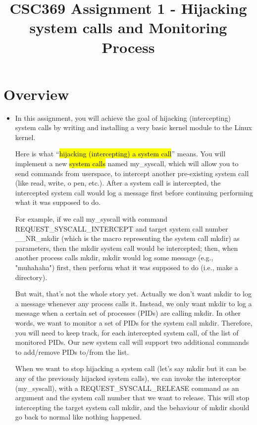 \documentclass[12pt]{article}
\begin{document}
\title{CSC369 Assignment 1 - Hijacking system calls and Monitoring Process}
\maketitle

\section{Overview}

\begin{itemize}
    \item

    In this assignment, you will achieve the goal of hijacking (intercepting)
    system calls by writing and installing a very basic kernel module to the Linux kernel.

    \bigskip

    Here is what ``\hl{hijacking (intercepting) a system call}'' means. You will implement
    a new \hl{system calls} named my\_syscall, which will allow you to send commands from
    userspace, to intercept another pre-existing system call (like read, write, o
    pen, etc.). After a system call is intercepted, the intercepted system call
    would log a message first before continuing performing what it was supposed to do.

    \bigskip

    For example, if we call my\_syscall with command REQUEST\_SYSCALL\_INTERCEPT
    and target system call number \_\_NR\_mkdir (which is the macro representing the
    system call mkdir) as parameters, then the mkdir system call would be intercepted;
    then, when another process calls mkdir, mkdir would log some message (e.g.,
    "muhahaha") first, then perform what it was supposed to do (i.e., make a directory).

    \bigskip

    But wait, that's not the whole story yet. Actually we don't want mkdir to log
    a message whenever any process calls it. Instead, we only want mkdir to log
    a message when a certain set of processes (PIDs) are calling mkdir. In other
    words, we want to monitor a set of PIDs for the system call mkdir. Therefore,
    you will need to keep track, for each intercepted system call, of the list of
    monitored PIDs. Our new system call will support two additional commands to add/remove
    PIDs to/from the list.

    \bigskip

    When we want to stop hijacking a system call (let's say mkdir but it can be any
    of the previously hijacked system calls), we can invoke the interceptor
    (my\_syscall), with a REQUEST\_SYSCALL\_RELEASE command as an argument and the
    system call number that we want to release. This will stop intercepting the
    target system call mkdir, and the behaviour of mkdir should go back to normal
    like nothing happened.
\end{itemize}
\end{document}
